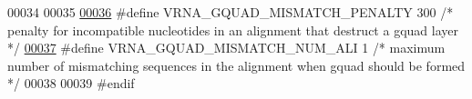 \begin{DoxyCode}
00034 
00035 
\mbox{\hyperlink{energy__const_8h_af37bf52de71466563295152ebae8b1da}{00036}} \textcolor{preprocessor}{#define   VRNA\_GQUAD\_MISMATCH\_PENALTY   300   }\textcolor{comment}{/* penalty for incompatible nucleotides in an alignment that
       destruct a gquad layer */}\textcolor{preprocessor}{}
\mbox{\hyperlink{energy__const_8h_a55db6ce24e90cbf4a7833167b999f172}{00037}} \textcolor{preprocessor}{#define   VRNA\_GQUAD\_MISMATCH\_NUM\_ALI   1   }\textcolor{comment}{/* maximum number of mismatching sequences in the alignment
       when gquad should be formed */}\textcolor{preprocessor}{}
00038 
00039 \textcolor{preprocessor}{#endif}
\end{DoxyCode}
